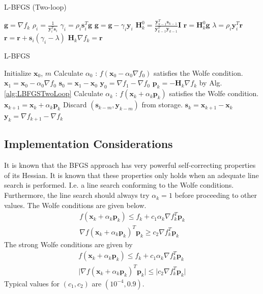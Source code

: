 \documentclass[a4paper,10pt]{article}
\theoremstyle{definition}
\begin{document}
\begin{algorithm}[H]
	\DontPrintSemicolon
	\caption{L-BFGS (Two-loop)}
	
	$\pmb{g} = \nabla f_k$\;
	{
		$\rho_i = \frac{1}{\pmb{y}_i^T \pmb{s}_i}$\;
		$\gamma_i = \rho_i \pmb{s}_i^T\pmb{g}$\;
		$\pmb{g} = \pmb{g} - \gamma_i \pmb{y}_i$\;
	}
	$\pmb{H}_k^0 = \frac{\pmb{y}_{k-1}^T\pmb{s}_{k-1}}{\pmb{y}_{k-1}^T\pmb{y}_{k-1}} \pmb{I}$\;
	$\pmb{r} = \pmb{H}_k^0\pmb{g}$\;
	{
		$\lambda = \rho_i \pmb{y}_i^T \pmb{r}$\;
		$\pmb{r} = \pmb{r} + \pmb{s}_i(\gamma_i - \lambda)$\;
	}
	$\pmb{H}_k\nabla f_k = \pmb{r}$\;
	\label{alg:LBFGSTwoLoop}
\end{algorithm}
\begin{algorithm}[H]
	\DontPrintSemicolon
	\caption{L-BFGS}
	Initialize $\pmb{x}_0$, $m$\;
	Calculate $\alpha_0$ : $f(\pmb{x}_0 - \alpha_0 \nabla f_0)$ satisfies the Wolfe condition. \;
	$\pmb{x}_1 = \pmb{x}_0 - \alpha_0 \nabla f_0$\;
	$\pmb{s}_0 = \pmb{x}_1 - \pmb{x}_0$\;
	$\pmb{y}_0 = \nabla f_1 - \nabla f_0$\;
	{
		$\pmb{p}_k = - \pmb{H}_k \nabla f_k$ by Alg. \ref{alg:LBFGSTwoLoop}\;
		Calculate $\alpha_k$ : $f(\pmb{x}_k + \alpha_k \pmb{p}_k)$ satisfies the Wolfe condition. \;
		$\pmb{x}_{k+1} = \pmb{x}_k + \alpha_k \pmb{p}_k$\;
		{
			Discard $(\pmb{s}_{k-m}, \pmb{y}_{k-m})$ from storage.\;
		}
		$\pmb{s}_k = \pmb{x}_{k+1} - \pmb{x}_k$\;
		$\pmb{y}_k = \nabla f_{k+1} - \nabla f_k$
	}
	\;
\end{algorithm}
\subsection{Implementation Considerations}
It is known that the BFGS approach has very powerful self-correcting properties of its Hessian. It is known that these properties only holds when an adequate line search is performed. I.e. a line search conforming to the Wolfe conditions. Furthermore, the line search should always try $\alpha_k = 1$ before proceeding to other values. The Wolfe conditions are given below.
\begin{gather}
	f(\pmb{x}_k + \alpha_k \pmb{p}_k) \leq f_k + c_1 \alpha_k \nabla f_k^T \pmb{p}_k\\
	\nabla f(\pmb{x}_k + \alpha_k \pmb{p}_k)^T \pmb{p}_k \geq c_2 \nabla f_k^T\pmb{p}_k
\end{gather}
The strong Wolfe conditions are given by
\begin{gather}
	f(\pmb{x}_k + \alpha_k \pmb{p}_k) \leq f_k + c_1 \alpha_k \nabla f_k^T \pmb{p}_k\\
	\vert \nabla f(\pmb{x}_k + \alpha_k \pmb{p}_k)^T \pmb{p}_k \vert \leq \vert c_2 \nabla f_k^T\pmb{p}_k \vert
\end{gather}
Typical values for $(c_1, c_2)$ are $(10^{-4},0.9)$. \\
\end{document}
